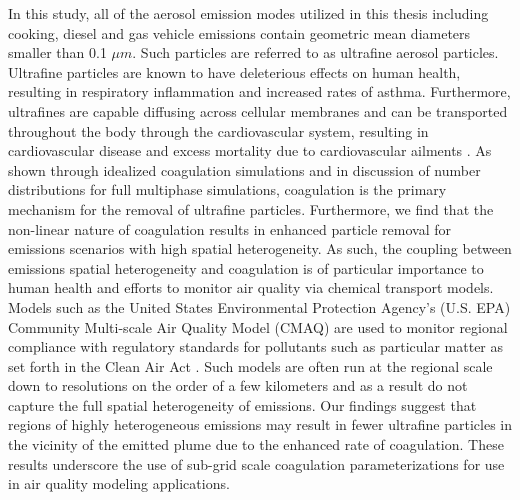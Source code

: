 In this study, all of the aerosol emission modes utilized in this thesis including cooking, diesel and gas vehicle emissions contain geometric mean diameters smaller than 0.1 $\mu m$. Such particles are referred to as ultrafine aerosol particles. Ultrafine particles are known to have deleterious effects on human health, resulting in respiratory inflammation and increased rates of asthma. Furthermore, ultrafines are capable diffusing across cellular membranes and can be transported throughout the body through the cardiovascular system, resulting in cardiovascular disease and excess mortality due to cardiovascular ailments \parencite{schraufnagel_health_2020}. As shown through idealized coagulation simulations and in discussion of number distributions for full multiphase simulations, coagulation is the primary mechanism for the removal of ultrafine particles. Furthermore, we find that the non-linear nature of coagulation results in enhanced particle removal for emissions scenarios with high spatial heterogeneity. As such, the coupling between emissions spatial heterogeneity and coagulation is of particular importance to human health and efforts to monitor air quality via chemical transport models. Models such as the United States Environmental Protection Agency's (U.S. EPA) Community Multi-scale Air Quality Model (CMAQ) are used to monitor regional compliance with regulatory standards for pollutants such as particular matter as set forth in the Clean Air Act \parencite{development_cmaq_2022}. Such models are often run at the regional scale down to resolutions on the order of a few kilometers and as a result do not capture the full spatial heterogeneity of emissions. Our findings suggest that regions of highly heterogeneous emissions may result in fewer ultrafine particles in the vicinity of the emitted plume due to the enhanced rate of coagulation. These results underscore the use of sub-grid scale coagulation parameterizations for use in air quality modeling applications. 

